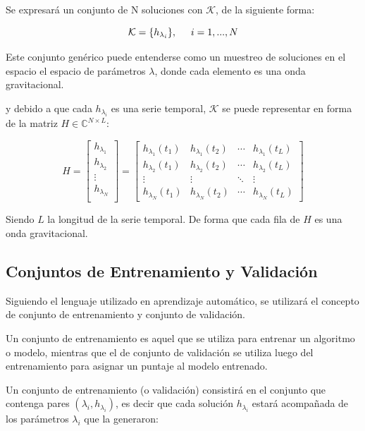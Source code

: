 Se expresará un conjunto de N soluciones con \( \mathcal{K} \), de la siguiente forma:

\[ \mathcal{K}  = \{h_{\lambda_i}\}, \hspace{5mm} i = 1, ..., N\]

Este conjunto genérico puede entenderse como un muestreo de soluciones en el espacio el espacio de parámetros $\lambda$, donde cada elemento es una onda gravitacional.

y debido a que cada $h_{\lambda_i}$ es una serie temporal, $\mathcal{K}$ se puede representar en forma de la matriz $H \in \mathbb{C}^{N\times L}$:

\[
H = 
\begin{bmatrix}
h_{\lambda_1} \\
h_{\lambda_2} \\
 \vdots \\
 h_{\lambda_N} \\
\end{bmatrix}
= 
\begin{bmatrix}
h_{\lambda_1}(t_1) & h_{\lambda_1}(t_2)  & \cdots & h_{\lambda_1}(t_L)\\
 h_{\lambda_2}(t_1) & h_{\lambda_2}(t_2)  & \cdots & h_{\lambda_2}(t_L)\\
 \vdots & \vdots & \ddots &  \vdots \\
h_{\lambda_N}(t_1) & h_{\lambda_N}(t_2)  & \cdots & h_{\lambda_N}(t_L)
\end{bmatrix}
\]

Siendo $L$ la longitud de la serie temporal. De forma que cada fila de $H$ es una onda gravitacional.

\subsection*{Conjuntos de Entrenamiento y Validación}

Siguiendo el lenguaje utilizado en aprendizaje automático, se utilizará el concepto de conjunto de entrenamiento y conjunto de validación.

Un conjunto de entrenamiento es aquel que se utiliza para entrenar un algoritmo o modelo, mientras que el de conjunto de validación se utiliza luego del entrenamiento para asignar un puntaje al modelo entrenado. 

Un conjunto de entrenamiento (o validación) consistirá en el conjunto que contenga pares $(\lambda_i, h_{\lambda_i})$, es decir que cada solución $h_{\lambda_i}$ estará acompañada de los parámetros $\lambda_i$ que la generaron:

